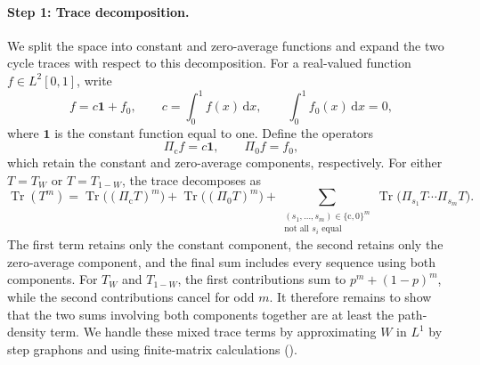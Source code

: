 \documentclass[11pt]{article}
\theoremstyle{remark}
\numberwithin{equation}{section}
\newcommand{\one}{\mathbf 1}
\newcommand{\Tr}{\operatorname{Tr}}
\newcommand{\dd}{\,\mathrm d}
\newcommand{\Tker}[1]{T_{#1}}
\begin{document}
\paragraph{Step 1: Trace decomposition.}
We split the space into constant and zero-average functions and expand the two cycle traces with respect to this decomposition.
For a real-valued function $f\in L^2[0,1]$, write
\[
  f=c\one+f_0,\qquad
  c=\int_0^1 f(x)\dd x,\qquad
  \int_0^1 f_0(x)\dd x=0,
\]
where $\one$ is the constant function equal to one.
Define the operators
\[
  \Pi_{\mathrm c} f=c\one,\qquad \Pi_0 f=f_0,
\]
which retain the constant and zero-average components, respectively.
For either $T=\Tker W$ or $T=\Tker{1-W}$, the trace decomposes as
\[
    \Tr(T^m)
    =  \Tr\bigl((\Pi_{\mathrm c}T)^m\bigr)
       +\Tr\bigl((\Pi_0T)^m\bigr)
       +\sum_{\substack{(s_1,\ldots,s_m)\in\{\mathrm c,0\}^m\\
                         \text{not all }s_i\text{ equal}}}
       \Tr\bigl(\Pi_{s_1}T\cdots\Pi_{s_m}T\bigr).
\]
The first term retains only the constant component, the second retains only the zero-average component, and the final sum includes every sequence using both components.
For $\Tker W$ and $\Tker{1-W}$, the first contributions sum to $p^m+(1-p)^m$, while the second contributions cancel for odd $m$.
It therefore remains to show that the two sums involving both components together are at least the path-density term.
We handle these mixed trace terms by approximating $W$ in $L^1$ by step graphons and using finite-matrix calculations ().
\end{document}

